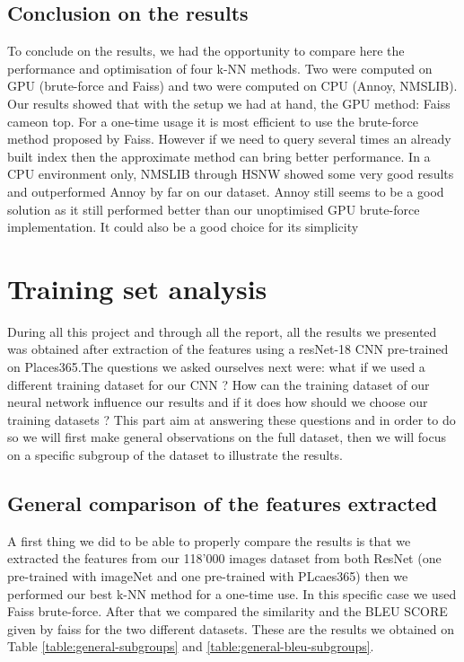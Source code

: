 \documentclass[a4paper]{article}
\begin{document}
\subsection{Conclusion on the results}
	To conclude on the results, we had the opportunity to compare here the performance and optimisation of four k-NN methods. Two were computed on GPU (brute-force and Faiss) and two were computed on CPU (Annoy, NMSLIB). Our results showed that with the setup we had at hand, the GPU method: Faiss cameon top. For a one-time usage it is most efficient to use the brute-force method proposed by Faiss. However if we need to query several times an already built index then the approximate method can bring better performance. In a CPU environment only, NMSLIB through HSNW showed some very good results and outperformed Annoy by far on our dataset. Annoy still seems to be a good solution as it still performed better than our unoptimised GPU brute-force implementation. It could also be a good choice for its simplicity

\section{Training set analysis}
	
	During all this project and through all the report, all the results we presented was obtained after extraction of the features using a resNet-18 CNN pre-trained on Places365.The questions we asked ourselves next were: what if we used a different training dataset for our CNN ? How can the training dataset of our neural network influence our results and if it does how should we choose our training datasets ? This part aim at answering these questions and in order to do so we will first make general observations on the full dataset, then we will focus on a specific subgroup of the dataset to illustrate the results.
	 
	\subsection{General comparison of the features extracted}
	
	A first thing we did to be able to properly compare the results is that we extracted the features from our 118'000 images dataset from both ResNet (one pre-trained with imageNet and one pre-trained with PLcaes365) then we performed our best k-NN method for a one-time use. In this specific case we used Faiss brute-force. After that we compared the similarity and the BLEU SCORE given by faiss for the two different datasets. These are the results we obtained on Table \ref{table:general-subgroups} and \ref{table:general-bleu-subgroups}.
\end{document}
